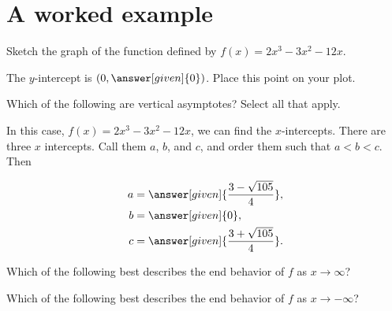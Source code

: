 \documentclass[noauthor,nooutcomes]{ximera}
\begin{document}
\section{A worked example}

\begin{example}
Sketch the graph of the function defined by $f(x)=2x^3-3x^2-12x$.

The $y$-intercept is $(0,\answer[given]{0})$. Place this point on your plot.
\begin{image}
\end{image}



Which of the following are vertical asymptotes?  Select all that apply.

\begin{selectAll}
\end{selectAll}

In this case, $f(x) =2x^3-3x^2-12x$, we can find the
$x$-intercepts.   There are three $x$ intercepts.  Call them $a$, $b$, and $c$, and order them such that $a<b<c$.  Then

\begin{align*}
  a &= \answer[given]{\frac{3-\sqrt{105}}{4}},\\
  b &= \answer[given]{0}, \\
  c &= \answer[given]{\frac{3+\sqrt{105}}{4}}.
\end{align*}



  Which of the following best describes the end behavior of $f$ as $x \to \infty$?		
  \begin{multipleChoice}
  \end{multipleChoice}
  Which of the following best describes the end behavior of $f$ as $x \to -\infty$?		
  \begin{multipleChoice}
  \end{multipleChoice}


\end{example}
\end{document}

